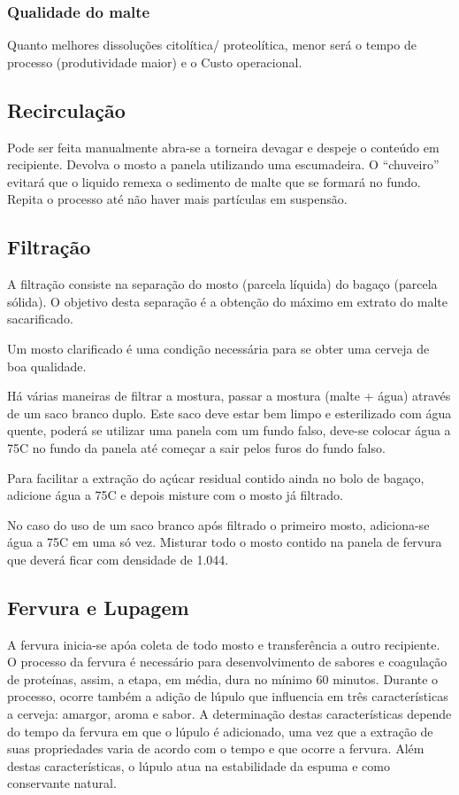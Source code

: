 \subsubsection{Qualidade do malte}
Quanto melhores dissoluções citolítica/ proteolítica, menor será o tempo de processo (produtividade maior) e o Custo operacional.

\subsection{Recirculação}

Pode ser feita manualmente abra-se a torneira devagar e despeje o conteúdo em recipiente. Devolva o mosto a panela utilizando uma escumadeira. O “chuveiro” evitará que o liquido remexa o sedimento de malte que se formará no fundo. Repita o processo até não haver mais partículas em suspensão.

\subsection{Filtração}

A filtração consiste na separação do mosto (parcela líquida) do bagaço (parcela sólida). O objetivo desta separação é a obtenção do máximo em extrato do malte sacarificado.

Um mosto clarificado é uma condição necessária para se obter uma cerveja de boa qualidade.

Há várias maneiras de filtrar a mostura, passar a mostura (malte + água) através de um saco branco duplo. Este saco deve estar bem limpo e esterilizado com água quente, poderá se utilizar uma panela com um fundo falso, deve-se colocar água a 75\textdegree C no fundo da panela até começar a sair pelos furos do fundo falso.

Para facilitar a extração do açúcar residual contido ainda no bolo de bagaço, adicione água a 75\textdegree C e depois misture com o mosto já filtrado.

No caso do uso de um saco branco após filtrado o primeiro mosto, adiciona-se água a 75\textdegree C em uma só vez. Misturar todo o mosto contido na panela de fervura que deverá ficar com densidade de 1.044.

\subsection{Fervura e Lupagem}

A fervura inicia-se apóa coleta de todo mosto e transferência a outro recipiente. 
O processo da fervura é necessário para desenvolvimento de sabores e coagulação de proteínas, assim, a etapa, em média, dura no mínimo 60 minutos. Durante o processo, ocorre também a adição de lúpulo que influencia em três características a cerveja: amargor, aroma e sabor. A determinação destas características depende do tempo da fervura em que o lúpulo é adicionado, uma vez que a extração de suas propriedades varia de acordo com o tempo e que ocorre a fervura. Além destas características, o lúpulo atua na estabilidade da espuma e como conservante natural.

